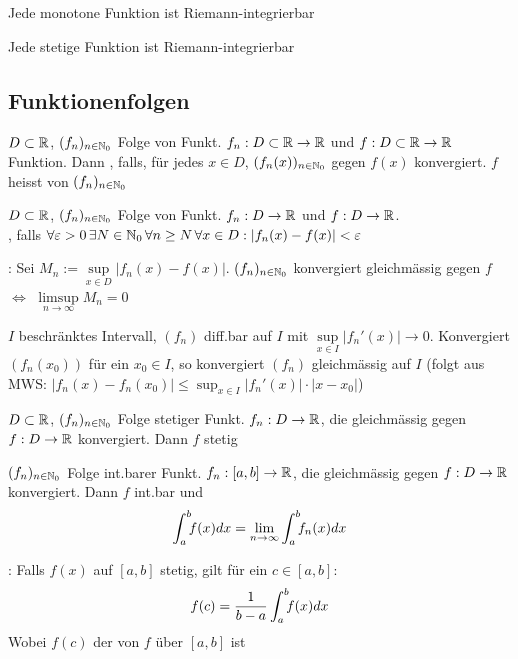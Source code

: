 \Satz Jede monotone Funktion ist Riemann-integrierbar

\Satz Jede stetige Funktion ist Riemann-integrierbar

\subsection{Funktionenfolgen}

\Def $D \subset \mathbb{R}$, $(f_n)_{n \in \mathbb{N}_0}$ Folge von Funkt. $f_n: D \subset \mathbb{R} \to \mathbb{R}$
und $f: D \subset \mathbb{R} \to \mathbb{R}$ Funktion.
Dann , falls, für jedes $x \in D$,
$(f_n(x))_{n\in\mathbb{N}_0}$ gegen $f(x)$ konvergiert. $f$ heisst 
von $(f_n)_{n\in\mathbb{N}_0}$

\Def $D \subset \mathbb{R}$, $(f_n)_{n\in\mathbb{N}_0}$ Folge von Funkt. $f_n: D \to \mathbb{R}$ und
$f: D \to \mathbb{R}$. \\
, falls
$\forall \varepsilon > 0 \, \exists N \in \mathbb{N}_0 \, \forall n \ge N \, \forall x \in D : |f_n(x) - f(x)| < \varepsilon$

\Satz {}: Sei $M_n := \sup\limits_{x\in D}|f_n(x)-f(x)|$.
$(f_n)_{n\in\mathbb{N}_0}$ konvergiert gleichmässig gegen $f$ $\iff$ $\limsup\limits_{n\to\infty} M_n = 0$

\Kor $I$ beschränktes Intervall, $(f_n)$ diff.bar auf $I$ mit $\sup\limits_{x\in I}|f_n'(x)| \to 0$.
Konvergiert $(f_n(x_0))$ für ein $x_0 \in I$, so konvergiert $(f_n)$ gleichmässig auf $I$
(folgt aus MWS: $|f_n(x) - f_n(x_0)| \le \sup_{x\in I}|f_n'(x)| \cdot |x - x_0|$)

\Satz $D \subset \mathbb{R}$, $(f_n)_{n \in \mathbb{N}_0}$ Folge stetiger Funkt. $f_n: D \to \mathbb{R}$, die gleichmässig
gegen $f: D \to \mathbb{R}$ konvergiert. Dann $f$ stetig

\Satz $(f_n)_{n \in \mathbb{N}_0}$ Folge int.barer Funkt. $f_n: [a, b] \to \mathbb{R}$, die gleichmässig
gegen $f: D \to \mathbb{R}$ konvergiert. Dann $f$ int.bar und
$$\displaystyle \int_a^b \hspace{-4pt}f(x)dx = \lim_{n\to\infty}\int_a^b \hspace{-4pt}f_n(x)dx$$

\Satz {}: Falls $f(x)$ auf $[a, b]$ stetig, gilt für ein
$c \in [a, b]$:
\vspace{-10pt}
$$f(c) = \frac{1}{b-a}\int_a^b \hspace{-4pt}f(x)dx$$
Wobei $f(c)$ der  von $f$ über $[a, b]$ ist

